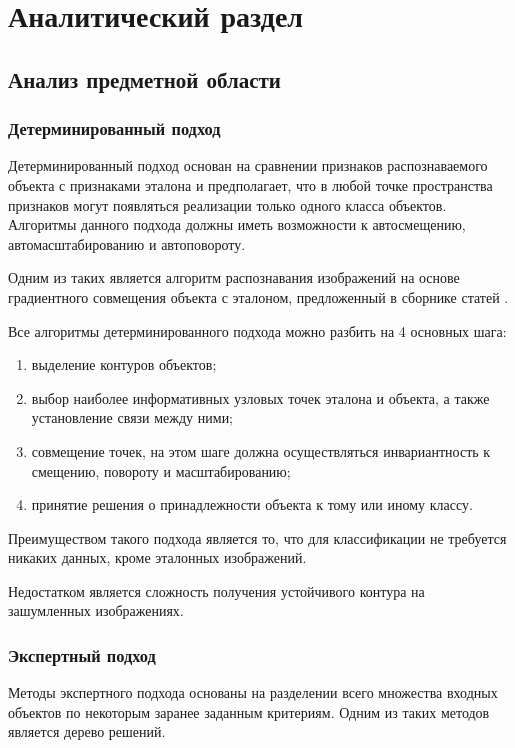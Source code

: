 \chapter{Аналитический раздел}

\section{Анализ предметной области}
\subsection{Детерминированный подход}

Детерминированный подход основан на сравнении признаков распознаваемого объекта с признаками эталона и предполагает, что в любой точке пространства признаков могут появляться реализации только одного класса объектов. Алгоритмы данного подхода должны иметь возможности к автосмещению, автомасштабированию и автоповороту.

Одним из таких является алгоритм распознавания изображений на основе градиентного совмещения объекта с эталоном, предложенный в сборнике статей \cite{cyberlenin2}.

Все алгоритмы детерминированного подхода можно разбить на 4 основных шага:
\begin{enumerate}
	\item выделение контуров объектов;
	\item выбор наиболее информативных узловых точек эталона и объекта, а также установление связи между ними;
	\item совмещение точек, на этом шаге должна осуществляться инвариантность к смещению, повороту и масштабированию;
	\item принятие решения о принадлежности объекта к тому или иному классу.
\end{enumerate}

Преимуществом такого подхода является то, что для классификации не требуется никаких данных, кроме эталонных изображений.

Недостатком является сложность получения устойчивого контура на зашумленных изображениях.

\subsection{Экспертный подход}

Методы экспертного подхода основаны на разделении всего множества входных объектов по некоторым заранее заданным критериям. Одним из таких методов является дерево решений.

